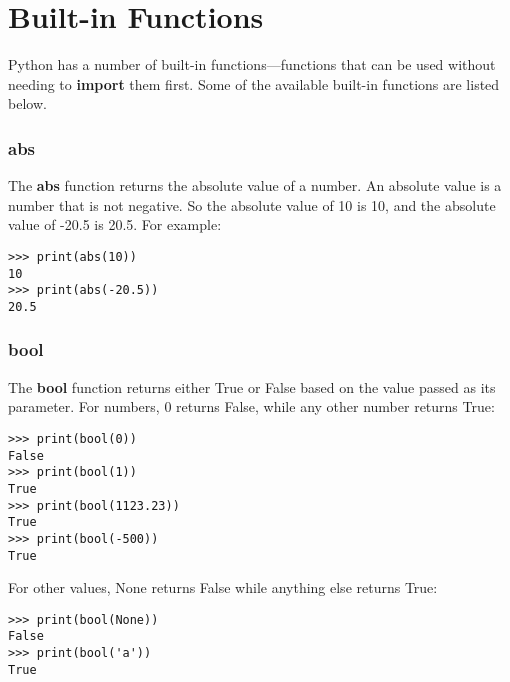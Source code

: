 

\chapter{Built-in Functions}\label{app:builtinfunctions}

Python has a number of built-in functions---functions that can be used without needing to \textbf{import} them first.  Some of the available built-in functions are listed below.

\subsection*{abs}

The \textbf{abs} function returns the absolute value of a number.  An absolute value is a number that is not negative.  So the absolute value of 10 is 10, and the absolute value of -20.5 is 20.5.  For example:

\begin{listing}
\begin{verbatim}
>>> print(abs(10))
10
>>> print(abs(-20.5))
20.5
\end{verbatim}
\end{listing}

\subsection*{bool}

The \textbf{bool} function returns either True or False based on the value passed as its parameter. For numbers, 0 returns False, while any other number returns True:

\begin{listing}
\begin{verbatim}
>>> print(bool(0))
False
>>> print(bool(1))
True
>>> print(bool(1123.23))
True
>>> print(bool(-500))
True
\end{verbatim}
\end{listing}

For other values, None returns False while anything else returns True:

\begin{listing}
\begin{verbatim}
>>> print(bool(None))
False
>>> print(bool('a'))
True 
\end{verbatim}
\end{listing}

